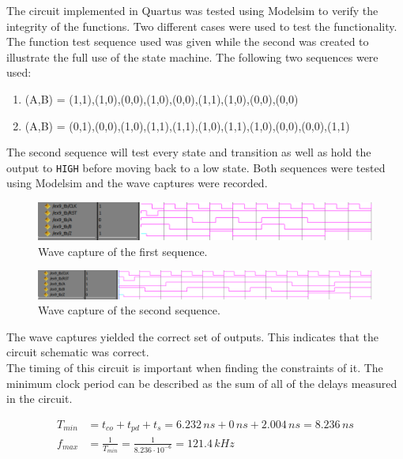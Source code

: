 \documentclass[CMPE]{KGCOEReport}
\begin{document}
The circuit implemented in Quartus was tested using Modelsim to verify the integrity of the functions. Two different cases were used to test the functionality. The function test sequence used was given while the second was created to illustrate the full use of the state machine. The following two sequences were used:

\begin{enumerate}
\item (A,B) = (1,1),(1,0),(0,0),(1,0),(0,0),(1,1),(1,0),(0,0),(0,0)
\item (A,B) = (0,1),(0,0),(1,0),(1,1),(1,1),(1,0),(1,1),(1,0),(0,0),(0,0),(1,1)
\end{enumerate}

The second sequence will test every state and transition as well as hold the output to \texttt{HIGH} before moving back to a low state. Both sequences were tested using Modelsim and the wave captures were recorded.
\pagebreak

\begin{figure}[h!]
	\centering
	\includegraphics[width=\textwidth]{part1}
	\caption{Wave capture of the first sequence.}
	\label{fig:cap1}
\end{figure}
\begin{figure}[h!]
	\centering
	\includegraphics[width=\textwidth]{part2}
	\caption{Wave capture of the second sequence.}
	\label{fig:cap2}
\end{figure}

The wave captures yielded the correct set of outputs. This indicates that the circuit schematic was correct.\\

The timing of this circuit is important when finding the constraints of it. The minimum clock period can be described as the sum of all of the delays measured in the circuit.

\begin{align}
\label{eq:tmin}
T_{min} &= t_{co} + t_{pd} + t_s = 6.232\,ns + 0\,ns + 2.004\,ns = 8.236\,ns \\
\label{eq:fmax}
f_{max} &= \frac{1}{T_{min}} = \frac{1}{8.236 \cdot 10^{-6}} = 121.4\,kHz
\end{align}
\end{document}
